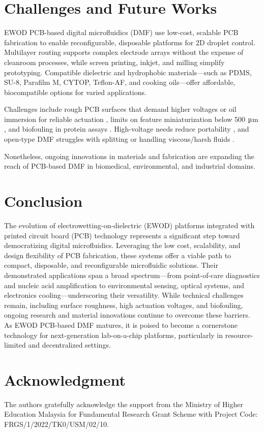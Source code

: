 \documentclass[conference,a4paper]{IEEEtran}
\begin{document}
\section{Challenges and Future Works}
EWOD PCB-based digital microfluidics (DMF) use low-cost, scalable PCB fabrication to enable reconfigurable, disposable platforms for 2D droplet control. Multilayer routing supports complex electrode arrays without the expense of cleanroom processes, while screen printing, inkjet, and milling simplify prototyping. Compatible dielectric and hydrophobic materials—such as PDMS, SU-8, Parafilm M, CYTOP, Teflon-AF, and cooking oils—offer affordable, biocompatible options for varied applications.

Challenges include rough PCB surfaces that demand higher voltages or oil immersion for reliable actuation \cite{jiangongDirectreferencingTwodimensionalarrayDigital2008}, limits on feature miniaturization below 500 $\micro$m \cite{abadianHybridPaperbasedMicrofluidics2017}, and biofouling in protein assays \cite{dimovElectrowettingbasedDigitalMicrofluidics2020}. High-voltage needs reduce portability \cite{barmanElectrowettingondielectricEWODCurrent2020}, and open-type DMF struggles with splitting or handling viscous/harsh fluids \cite{yafiaUltraportableSmartphoneControlled2015,pengFingerpoweredElectrophoreticTransport2016}.

Nonetheless, ongoing innovations in materials and fabrication are expanding the reach of PCB-based DMF in biomedical, environmental, and industrial domains.
\section{Conclusion}
The evolution of electrowetting-on-dielectric (EWOD) platforms integrated with printed circuit board (PCB) technology represents a significant step toward democratizing digital microfluidics. Leveraging the low cost, scalability, and design flexibility of PCB fabrication, these systems offer a viable path to compact, disposable, and reconfigurable microfluidic solutions. Their demonstrated applications span a broad spectrum—from point-of-care diagnostics and nucleic acid amplification to environmental sensing, optical systems, and electronics cooling—underscoring their versatility. While technical challenges remain, including surface roughness, high actuation voltages, and biofouling, ongoing research and material innovations continue to overcome these barriers. As EWOD PCB-based DMF matures, it is poised to become a cornerstone technology for next-generation lab-on-a-chip platforms, particularly in resource-limited and decentralized settings.

\section*{Acknowledgment}
The authors gratefully acknowledge the support from the Ministry of Higher Education Malaysia for Fundamental Research Grant Scheme with Project Code: FRGS/1/2022/TK0/USM/02/10.



\end{document}
